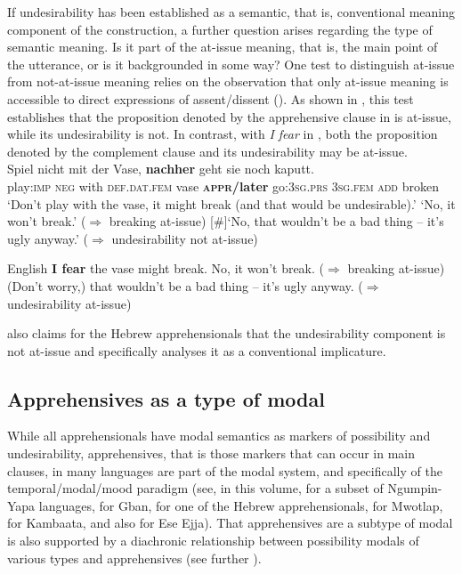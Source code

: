 \documentclass[output=paper,colorlinks,citecolor=brown
]{langscibook}
\begin{document}
 If undesirability has been established as a semantic, that is, conventional meaning component of the construction, a further question arises regarding the type of semantic meaning. Is it part of the at-issue meaning, that is, the main point of the utterance, or is it backgrounded in some way? One test to distinguish at-issue from not-at-issue meaning  relies on the observation that only at-issue meaning is accessible to direct expressions of assent/dissent (\cite{faller2002,papafragou2006,tonhauser2012,murray2021}). As shown in , this test establishes that the proposition denoted by the apprehensive clause in  is at-issue, while its undesirability is not. In contrast, with \textit{I fear} in , both the proposition denoted by the complement clause and its undesirability may be at-issue.
\newpage
\ea \label{ex:intro18} 
\\
\gll Spiel nicht mit der Vase, \textbf{nachher} geht sie noch kaputt. \\
play:\textsc{imp} \textsc{neg} with \textsc{def.dat.fem} vase \textsc{\textbf{appr/}}\textbf{later} go:\textsc{3sg.prs} \textsc{3sg.fem} \textsc{add} broken \\
\glt `Don't play with the vase, it might break (and that would be undesirable).'
 `No, it won't break.' ($\Rightarrow$ breaking at-issue)
[\#]{`No, that wouldn't be a bad thing -- it's ugly anyway.' ($\Rightarrow$ undesirability not at-issue)}
\z


\ea \label{ex:intro19} \textnormal{English}
 \textbf{I fear} the vase might break.
 No, it won't break. (\textnormal{$\Rightarrow$ breaking at-issue})
 (Don't worry,) that wouldn't be a bad thing -- it's ugly anyway. (\textnormal{$\Rightarrow$ undesirability at-issue})
\z


\noindent \citet{chapters/francez} also claims for the Hebrew apprehensionals that the undesirability component is not at-issue and specifically analyses it as a conventional implicature.


\subsection{Apprehensives as a type of modal}
\label{subsec:modal}

While all apprehensionals have modal semantics as markers of possibility and undesirability, apprehensives, that is those markers that can occur in main clauses, in many languages are part of the modal system, and specifically of the temporal/modal/mood paradigm (see, in this volume, \citeauthor{chapters/browne} for a subset of Ngumpin-Yapa languages, \citeauthor{chapters/fedotov} for Gban,  \citeauthor{chapters/francez} for one of the Hebrew apprehensionals, \citeauthor{chapters/francois} for Mwotlap, \citeauthor{chapters/treis} for Kambaata, and also \citealt{vuillermet2012} \citeyear{vuillermet2018a} for Ese Ejja). That apprehensives are a subtype of modal is also supported by a diachronic relationship between possibility modals of various types and apprehensives (see further ).
\end{document}
